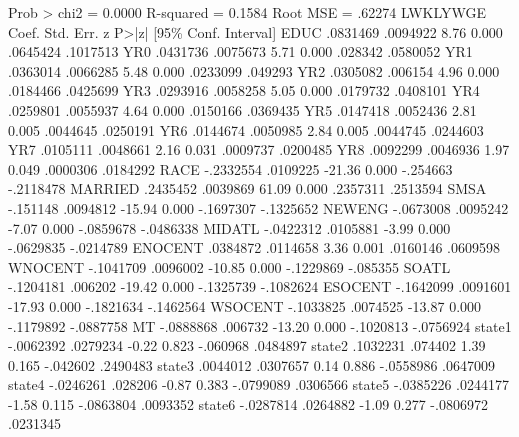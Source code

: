                                                   Prob > chi2     =     0.0000
                                                  R-squared       =     0.1584
                                                  Root MSE        =     .62274
{\smallskip}
    LWKLYWGE {\VBAR}      Coef.   Std. Err.      z    P>|z|     [95\% Conf. Interval]
        EDUC {\VBAR}   .0831469   .0094922     8.76   0.000     .0645424    .1017513
         YR0 {\VBAR}   .0431736   .0075673     5.71   0.000      .028342    .0580052
         YR1 {\VBAR}   .0363014   .0066285     5.48   0.000     .0233099     .049293
         YR2 {\VBAR}   .0305082    .006154     4.96   0.000     .0184466    .0425699
         YR3 {\VBAR}   .0293916   .0058258     5.05   0.000     .0179732    .0408101
         YR4 {\VBAR}   .0259801   .0055937     4.64   0.000     .0150166    .0369435
         YR5 {\VBAR}   .0147418   .0052436     2.81   0.005     .0044645    .0250191
         YR6 {\VBAR}   .0144674   .0050985     2.84   0.005     .0044745    .0244603
         YR7 {\VBAR}   .0105111   .0048661     2.16   0.031     .0009737    .0200485
         YR8 {\VBAR}   .0092299   .0046936     1.97   0.049     .0000306    .0184292
        RACE {\VBAR}  -.2332554   .0109225   -21.36   0.000     -.254663   -.2118478
     MARRIED {\VBAR}   .2435452   .0039869    61.09   0.000     .2357311    .2513594
        SMSA {\VBAR}   -.151148   .0094812   -15.94   0.000    -.1697307   -.1325652
      NEWENG {\VBAR}  -.0673008   .0095242    -7.07   0.000    -.0859678   -.0486338
      MIDATL {\VBAR}  -.0422312   .0105881    -3.99   0.000    -.0629835   -.0214789
     ENOCENT {\VBAR}   .0384872   .0114658     3.36   0.001     .0160146    .0609598
     WNOCENT {\VBAR}  -.1041709   .0096002   -10.85   0.000    -.1229869    -.085355
       SOATL {\VBAR}  -.1204181    .006202   -19.42   0.000    -.1325739   -.1082624
     ESOCENT {\VBAR}  -.1642099   .0091601   -17.93   0.000    -.1821634   -.1462564
     WSOCENT {\VBAR}  -.1033825   .0074525   -13.87   0.000    -.1179892   -.0887758
          MT {\VBAR}  -.0888868    .006732   -13.20   0.000    -.1020813   -.0756924
      state1 {\VBAR}  -.0062392   .0279234    -0.22   0.823     -.060968    .0484897
      state2 {\VBAR}   .1032231    .074402     1.39   0.165     -.042602    .2490483
      state3 {\VBAR}   .0044012   .0307657     0.14   0.886    -.0558986    .0647009
      state4 {\VBAR}  -.0246261    .028206    -0.87   0.383    -.0799089    .0306566
      state5 {\VBAR}  -.0385226   .0244177    -1.58   0.115    -.0863804    .0093352
      state6 {\VBAR}  -.0287814   .0264882    -1.09   0.277    -.0806972    .0231345
